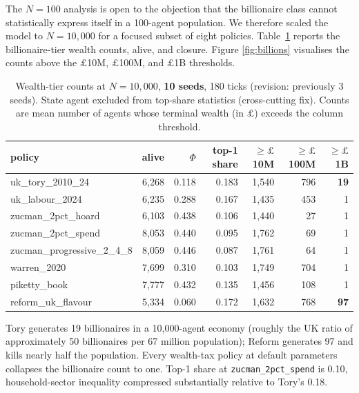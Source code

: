\documentclass[11pt]{article}
\begin{document}
The $N=100$ analysis is open to the objection that the billionaire
class cannot statistically express itself in a 100-agent population.
We therefore scaled the model to $N=10{,}000$ for a focused subset of
eight policies. Table~\ref{tab:policies-10k} reports the
billionaire-tier wealth counts, alive, and closure. Figure
\ref{fig:billions} visualises the counts above the $\pounds$10M,
$\pounds$100M, and $\pounds$1B thresholds.

\begin{table}[t]
\centering
\small
\caption{Wealth-tier counts at $N=10{,}000$, \textbf{10 seeds}, 180
ticks (revision: previously 3 seeds). State agent excluded from
top-share statistics (cross-cutting fix). Counts are mean number of
agents whose terminal wealth (in $\pounds$) exceeds the column
threshold.}
\label{tab:policies-10k}
\begin{tabular}{lrrrrrr}
\toprule
policy & alive & $\Phi$ & top-1 share & $\geq \pounds$10M & $\geq \pounds$100M & $\geq \pounds$1B \\
\midrule
uk\_tory\_2010\_24            & 6{,}268 & 0.118 & 0.183 & 1{,}540 & 796 & \textbf{19} \\
uk\_labour\_2024              & 6{,}235 & 0.288 & 0.167 & 1{,}435 & 453 & 1 \\
zucman\_2pct\_hoard           & 6{,}103 & 0.438 & 0.106 & 1{,}440 & 27  & 1 \\
zucman\_2pct\_spend           & 8{,}053 & 0.440 & 0.095 & 1{,}762 & 69  & 1 \\
zucman\_progressive\_2\_4\_8 & 8{,}059 & 0.446 & 0.087 & 1{,}761 & 64  & 1 \\
warren\_2020                  & 7{,}699 & 0.310 & 0.103 & 1{,}749 & 704 & 1 \\
piketty\_book                 & 7{,}777 & 0.432 & 0.135 & 1{,}456 & 108 & 1 \\
reform\_uk\_flavour           & 5{,}334 & 0.060 & 0.172 & 1{,}632 & 768 & \textbf{97} \\
\bottomrule
\end{tabular}
\end{table}

Tory generates 19 billionaires in a 10{,}000-agent economy
(roughly the UK ratio of approximately 50 billionaires per 67
million population); Reform generates 97 and kills nearly half the
population. Every wealth-tax policy at default parameters collapses
the billionaire count to one. Top-1 share at \texttt{zucman\_2pct\_spend}
is 0.10, household-sector inequality compressed substantially relative
to Tory's 0.18.
\end{document}

